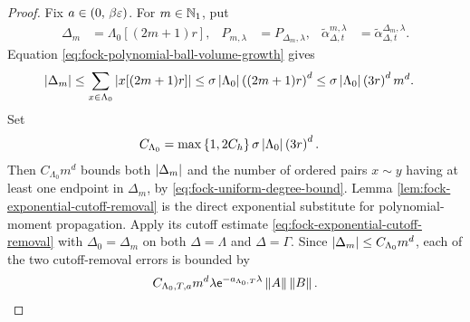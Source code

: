 \documentclass[11pt,a4paper]{article}
\theoremstyle{plain}
\theoremstyle{definition}
\theoremstyle{remark}
\begin{document}
\begin{proof}
Fix $a \in \left( 0,\,\beta\varepsilon \right)$.
For $m\in\mathbb{N}_1$, put
$$\begin{aligned}
\Delta_m
& =
\Lambda_0[(2m + 1)r],
&
P_{m,\lambda}
& =
P_{\Delta_m,\lambda},
&
\widetilde{\alpha}_{\Delta,t}^{m,\lambda}
& =
\widetilde{\alpha}_{\Delta,t}^{\Delta_m,\lambda}.
\end{aligned}$$
Equation \eqref{eq:fock-polynomial-ball-volume-growth} gives
$$\begin{aligned}
\left| \Delta_m \right|
& \leq
\sum_{x\in \Lambda_0}\left| x[(2m+1)r] \right|
\leq
\sigma\left| \Lambda_0 \right|\left( (2m+1)r \right)^d
\leq
\sigma\left| \Lambda_0 \right|\left( 3r \right)^dm^d.
\end{aligned}$$
Set
$$\begin{aligned}
C_{\Lambda_0}
& =
\max\left\{ 1,2C_h \right\}\sigma\left| \Lambda_0 \right|\left( 3r \right)^d.
\end{aligned}$$
Then $C_{\Lambda_0}m^d$ bounds both $\left| \Delta_m \right|$ and the number of ordered pairs $x\sim y$ having
at least one endpoint in $\Delta_m$, by \eqref{eq:fock-uniform-degree-bound}.
Lemma \ref{lem:fock-exponential-cutoff-removal} is the direct exponential substitute for polynomial-moment
propagation.
Apply its cutoff estimate \eqref{eq:fock-exponential-cutoff-removal} with $\Delta_0=\Delta_m$ on both
$\Delta=\Lambda$ and $\Delta=\Gamma$.
Since $\left| \Delta_m \right|\leq C_{\Lambda_0}m^d$, each of the two cutoff-removal errors is bounded by
\begin{equation}
\begin{aligned}
C_{\Lambda_0,T,a}m^d\lambda\mathsf{e}^{-a_{\Lambda_0,T}\lambda}\left\Vert A \right\Vert\left\Vert B \right\Vert.
\end{aligned}
\label{eq:fock-direct-exponential-cutoff-error}
\end{equation}


\end{proof}
\end{document}
